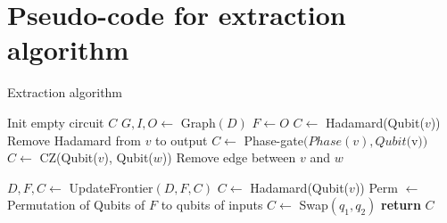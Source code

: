 \documentclass[a4paper,onecolumn,superscriptaddress,11pt,accepted=2020-04-27]{quantumarticle}
\theoremstyle{definition}
\begin{document}
\newpage

\section{Pseudo-code for extraction algorithm}
\label{sec:algorithms}

\makeatletter
\algrenewcommand\ALG@beginalgorithmic{\small}
\makeatother

\renewcommand\algorithmiccomment[1]{\hfill{\color{gray!80!green}$\triangleright$\,\textit{#1}}}


\begin{algorithm}[!htb]
\caption{Extraction algorithm}\label{alg:extraction}
\begin{algorithmic}[1]
  \State Init empty circuit $C$
  \State $G,I,O\gets $ Graph$(D)$
  \State $F \gets O$ 
      \State $C\gets $ Hadamard(Qubit($v$))
      \State Remove Hadamard from $v$ to output
    \EndIf
      \State $C\gets $ Phase-gate$(Phase(v),Qubit($v$))$
    \EndIf
  \EndFor
    \State $C\gets $ CZ(Qubit($v$), Qubit($w$))
    \State Remove edge between $v$ and $w$
  \EndFor

    \State $D,F,C \gets $ UpdateFrontier$(D,F,C)$
  \EndWhile
   
      \State $C\gets$ Hadamard(Qubit($v$))
    \EndIf
  \EndFor
  \State Perm $\gets$ Permutation of Qubits of $F$ to qubits of inputs
    \State $C\gets$ Swap$(q_1,q_2)$
  \EndFor
  \State \textbf{return} $C$
\EndProcedure


\end{algorithmic}
\end{algorithm}
\end{document}
